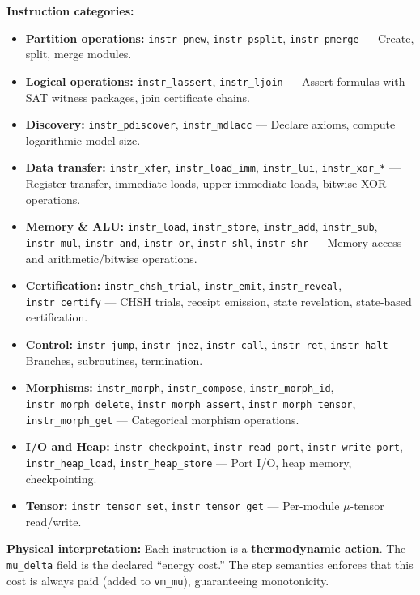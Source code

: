 \textbf{Instruction categories:}
\begin{itemize}
    \item \textbf{Partition operations:} \texttt{instr\_pnew}, \texttt{instr\_psplit}, \texttt{instr\_pmerge} — Create, split, merge modules.
    \item \textbf{Logical operations:} \texttt{instr\_lassert}, \texttt{instr\_ljoin} — Assert formulas with SAT witness packages, join certificate chains.
    \item \textbf{Discovery:} \texttt{instr\_pdiscover}, \texttt{instr\_mdlacc} — Declare axioms, compute logarithmic model size.
    \item \textbf{Data transfer:} \texttt{instr\_xfer}, \texttt{instr\_load\_imm}, \texttt{instr\_lui}, \texttt{instr\_xor\_*} — Register transfer, immediate loads, upper-immediate loads, bitwise XOR operations.
    \item \textbf{Memory \& ALU:} \texttt{instr\_load}, \texttt{instr\_store}, \texttt{instr\_add}, \texttt{instr\_sub}, \texttt{instr\_mul}, \texttt{instr\_and}, \texttt{instr\_or}, \texttt{instr\_shl}, \texttt{instr\_shr} — Memory access and arithmetic/bitwise operations.
    \item \textbf{Certification:} \texttt{instr\_chsh\_trial}, \texttt{instr\_emit}, \texttt{instr\_reveal}, \texttt{instr\_certify} — CHSH trials, receipt emission, state revelation, state-based certification.
    \item \textbf{Control:} \texttt{instr\_jump}, \texttt{instr\_jnez}, \texttt{instr\_call}, \texttt{instr\_ret}, \texttt{instr\_halt} — Branches, subroutines, termination.
    \item \textbf{Morphisms:} \texttt{instr\_morph}, \texttt{instr\_compose}, \texttt{instr\_morph\_id}, \texttt{instr\_morph\_delete}, \texttt{instr\_morph\_assert}, \texttt{instr\_morph\_tensor}, \texttt{instr\_morph\_get} — Categorical morphism operations.
    \item \textbf{I/O and Heap:} \texttt{instr\_checkpoint}, \texttt{instr\_read\_port}, \texttt{instr\_write\_port}, \texttt{instr\_heap\_load}, \texttt{instr\_heap\_store} — Port I/O, heap memory, checkpointing.
    \item \textbf{Tensor:} \texttt{instr\_tensor\_set}, \texttt{instr\_tensor\_get} — Per-module $\mu$-tensor read/write.
\end{itemize}


\textbf{Physical interpretation:} Each instruction is a \textbf{thermodynamic action}. The \texttt{mu\_delta} field is the declared ``energy cost.'' The step semantics enforces that this cost is always paid (added to \texttt{vm\_mu}), guaranteeing monotonicity.

